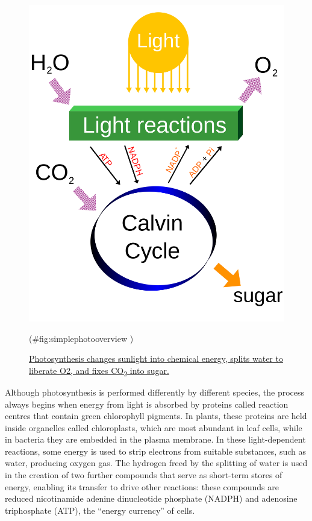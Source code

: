 \begin{figure}

{\centering \includegraphics[width=0.7\linewidth]{./figures/photosynthesis/Simple_photosynthesis_overview} 

}

\caption{\href{https://commons.wikimedia.org/wiki/File:Simple_photosynthesis_overview.svg}{Photosynthesis changes sunlight into chemical energy, splits water to liberate O2, and fixes CO\textsubscript{2} into sugar.}}(\#fig:simplephotooverview )
\end{figure}

Although photosynthesis is performed differently by different species, the process always begins when energy from light is absorbed by proteins called reaction centres that contain green chlorophyll pigments. In plants, these proteins are held inside organelles called chloroplasts, which are most abundant in leaf cells, while in bacteria they are embedded in the plasma membrane. In these light-dependent reactions, some energy is used to strip electrons from suitable substances, such as water, producing oxygen gas. The hydrogen freed by the splitting of water is used in the creation of two further compounds that serve as short-term stores of energy, enabling its transfer to drive other reactions: these compounds are reduced nicotinamide adenine dinucleotide phosphate (NADPH) and adenosine triphosphate (ATP), the ``energy currency'' of cells.



